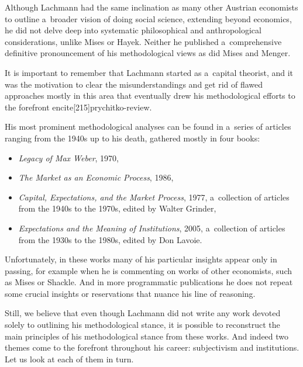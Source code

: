 {\label{sec:tenets}



Although Lachmann had the same inclination as many other Austrian economists to outline a~broader vision of doing social science, extending beyond economics, he did not delve deep into systematic philosophical and anthropological considerations, unlike Mises or Hayek. Neither he published a~comprehensive definitive pronouncement of his methodological views as did Mises and Menger.

It is important to remember that Lachmann started as a~capital theorist, and it was the motivation to clear the misunderstandings and get rid of flawed approaches mostly in this area that eventually drew his methodological efforts to the forefront encite[215]{prychitko-review}.



His most prominent methodological analyses can be found in a~series of articles ranging from the 1940s up to his death, gathered mostly in four books:

\begin{itemize}

\item \emph{Legacy of Max Weber}, 1970,

\item \emph{The Market as an Economic Process}, 1986,

\item \emph{Capital, Expectations, and the Market Process}, 1977, a~collection of articles from the 1940s to the 1970s, edited by Walter Grinder,

\item \emph{Expectations and the Meaning of Institutions}, 2005, a~collection of articles from the 1930s to the 1980s, edited by Don Lavoie.

\end{itemize}

Unfortunately, in these works many of his particular insights appear only in passing, for example when he is commenting on works of other economists, such as Mises or Shackle. And in more programmatic publications he does not repeat some crucial insights or reservations that nuance his line of reasoning.

Still, we believe that even though Lachmann did not write any work devoted solely to outlining his methodological stance, it is possible to reconstruct the main principles of his methodological stance from these works. And indeed two themes come to the forefront throughout his career: subjectivism and institutions. Let us look at each of them in turn.



}
